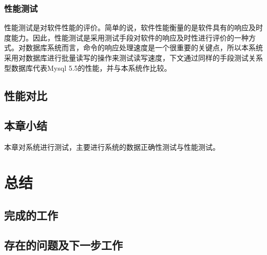 \documentclass{zjutthesis}
\begin{document}
\subsection{性能测试}
性能测试是对软件性能的评价。简单的说，软件性能衡量的是软件具有的响应及时度能力。因此，性能测试是采用测试手段对软件的响应及时性进行评价的一种方式。对数据库系统而言，命令的响应处理速度是一个很重要的关键点，所以本系统采用对数据库进行批量读写的操作来测试读写速度，下文通过同样的手段测试关系型数据库代表Mysql 5.5的性能，并与本系统作比较。

\section{性能对比} %

\section{本章小结}
本章对系统进行测试，主要进行系统的数据正确性测试与性能测试。

\chapter{总结}
\section{完成的工作}

\section{存在的问题及下一步工作}

\backmatter


\nocite{*}                                   %


\appendix

\end{document}
